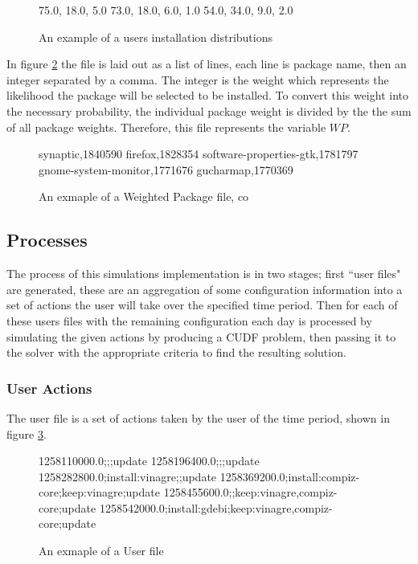 \begin{figure}[htp]
\begin{center}
75.0, 18.0, 5.0
73.0, 18.0, 6.0, 1.0
54.0, 34.0, 9.0, 2.0
\caption[Install Distribution Example File]{An example of a users installation distributions}
\label{userprob}
\end{center}
\end{figure}

In figure \ref{packageprob} the file is laid out as a list of lines, each line is package name, then an integer separated by a comma.
The integer is the weight which represents the likelihood the package will be selected to be installed.
To convert this weight into the necessary probability, the individual package weight is divided by the the sum of all package weights. 
Therefore, this file represents the variable $WP$.

\begin{figure}[htp]
\begin{center}
synaptic,1840590
firefox,1828354
software-properties-gtk,1781797
gnome-system-monitor,1771676
gucharmap,1770369
\caption[Weighted Package File Example]{An exmaple of a Weighted Package file, co }
\label{packageprob}
\end{center}
\end{figure}


\subsection{Processes}
The process of this simulations implementation is in two stages; 
first ``user files" are generated, these are an aggregation of some configuration information into a set of actions the user will take over the specified time period.
Then for each of these users files with the remaining configuration each day is processed by simulating the given actions by producing a CUDF problem,
then passing it to the solver with the appropriate criteria to find the resulting solution.

\subsubsection{User Actions}
The user file is a set of actions taken by the user of the time period, shown in figure \ref{userfile}.

\begin{figure}[htp]
\begin{center}
1258110000.0;;;update
1258196400.0;;;update
1258282800.0;install:vinagre;;update
1258369200.0;install:compiz-core;keep:vinagre;update
1258455600.0;;keep:vinagre,compiz-core;update
1258542000.0;install:gdebi;keep:vinagre,compiz-core;update
  \caption[User File example]{An exmaple of a User file}
  \label{userfile}
\end{center}
\end{figure}


